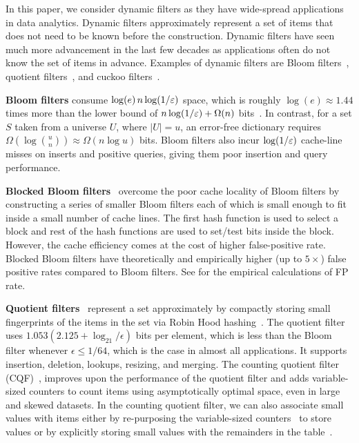 In this paper, we consider dynamic filters as they have wide-spread applications
in data analytics.  Dynamic filters approximately represent a set of items that
does not need to be known before the construction. Dynamic filters have seen
much more advancement in the last few decades as applications often do not know
the set of items in advance. Examples of dynamic filters are Bloom
filters~\cite{Bloom70}, quotient filters~\cite{BenderFaJo12,
PandeyBJP17b,DillingerMa09,PaghPaRa05,EinzigerFr16}, and cuckoo
filters~\cite{FanAnKa14,BreslowJ18}.

\textbf{Bloom filters} consume $\log(e)\, n\log (1/\varepsilon)$ space, which is roughly
$\log(e)\approx 1.44$ times more than the lower bound of $n\log (1/\varepsilon) + \Omega(n)$
bits~\cite{CarterFG78}. In contrast, for a set $S$ taken from a universe $U$,
where $|U|=u$, an error-free dictionary requires $\Omega(\log {u\choose n})
\approx \Omega(n \log u)$ bits. Bloom filters also incur $\log (1/\varepsilon)$ cache-line
misses on inserts and positive queries, giving them poor insertion and query
performance.

\textbf{Blocked Bloom filters}~\cite{putze2007cache} overcome the poor cache
locality of Bloom filters by constructing a series of smaller Bloom filters each
of which is small enough to fit inside a small number of cache lines. The first
hash function is used to select a block and rest of the hash functions are used
to set/test bits inside the block. However, the cache efficiency comes at the
cost of higher false-positive rate. Blocked Bloom filters have theoretically and
empirically higher (up to $5\times$) false positive rates compared to Bloom
filters. See  for the empirical calculations of FP
rate.

\textbf{Quotient
filters}~\cite{Cleary84,PaghPaRa05,DillingerMa09,BenderFaJo12a,PandeyBJP17,pandeySigmod21}
represent a set approximately by compactly storing small fingerprints of the
items in the set via Robin Hood hashing~\cite{CelisLaMu85}. The quotient filter
uses $1.053 (2.125 + \log_21/\epsilon)$ bits per element, which is less than the
Bloom filter whenever $\epsilon \leq 1/64$, which is the case in almost all
applications. It supports insertion, deletion, lookups, resizing, and merging.
The counting quotient filter (CQF)~\cite{PandeyBJP17}, improves upon the
performance of the quotient filter and adds variable-sized counters to count
items using asymptotically optimal space, even in large and skewed datasets. In
the counting quotient filter, we can also associate small values with items
either by re-purposing the variable-sized counters~\cite{PandeyABFJP18Cell} to
store values or by explicitly storing small values with the remainders in the
table~\cite{PandeySMB20}.

